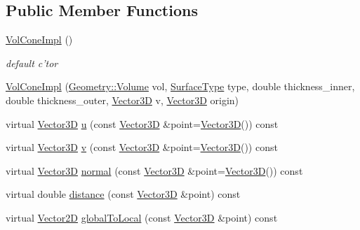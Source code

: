 \subsection*{Public Member Functions}
\begin{DoxyCompactItemize}
\item 
\hyperlink{class_d_d4hep_1_1_d_d_rec_1_1_vol_cone_impl_a53aac2e0c112ae12be098853a5b93d64}{VolConeImpl} ()
\begin{DoxyCompactList}\small\item\em default c'tor \item\end{DoxyCompactList}\item 
\hyperlink{class_d_d4hep_1_1_d_d_rec_1_1_vol_cone_impl_acdcb9ac446fc79054df650fa90a0d381}{VolConeImpl} (\hyperlink{class_d_d4hep_1_1_geometry_1_1_volume}{Geometry::Volume} vol, \hyperlink{class_d_d_surfaces_1_1_surface_type}{SurfaceType} type, double thickness\_\-inner, double thickness\_\-outer, \hyperlink{class_d_d_surfaces_1_1_vector3_d}{Vector3D} v, \hyperlink{class_d_d_surfaces_1_1_vector3_d}{Vector3D} origin)
\item 
virtual \hyperlink{class_d_d_surfaces_1_1_vector3_d}{Vector3D} \hyperlink{class_d_d4hep_1_1_d_d_rec_1_1_vol_cone_impl_ae3f99967ddeb67c1ad76414cea068395}{u} (const \hyperlink{class_d_d_surfaces_1_1_vector3_d}{Vector3D} \&point=\hyperlink{class_d_d_surfaces_1_1_vector3_d}{Vector3D}()) const 
\item 
virtual \hyperlink{class_d_d_surfaces_1_1_vector3_d}{Vector3D} \hyperlink{class_d_d4hep_1_1_d_d_rec_1_1_vol_cone_impl_a305c9b455b4e958dbb511f9136ecaf8b}{v} (const \hyperlink{class_d_d_surfaces_1_1_vector3_d}{Vector3D} \&point=\hyperlink{class_d_d_surfaces_1_1_vector3_d}{Vector3D}()) const 
\item 
virtual \hyperlink{class_d_d_surfaces_1_1_vector3_d}{Vector3D} \hyperlink{class_d_d4hep_1_1_d_d_rec_1_1_vol_cone_impl_aea04fc521c39ffc8e97ae3f700533e7a}{normal} (const \hyperlink{class_d_d_surfaces_1_1_vector3_d}{Vector3D} \&point=\hyperlink{class_d_d_surfaces_1_1_vector3_d}{Vector3D}()) const 
\item 
virtual double \hyperlink{class_d_d4hep_1_1_d_d_rec_1_1_vol_cone_impl_a28c958945f374cc59491e7ac4850bbde}{distance} (const \hyperlink{class_d_d_surfaces_1_1_vector3_d}{Vector3D} \&point) const 
\item 
virtual \hyperlink{class_d_d_surfaces_1_1_vector2_d}{Vector2D} \hyperlink{class_d_d4hep_1_1_d_d_rec_1_1_vol_cone_impl_a427ac9a8bccf658a2161b21d6ae1267f}{globalToLocal} (const \hyperlink{class_d_d_surfaces_1_1_vector3_d}{Vector3D} \&point) const 

\end{DoxyCompactItemize}
